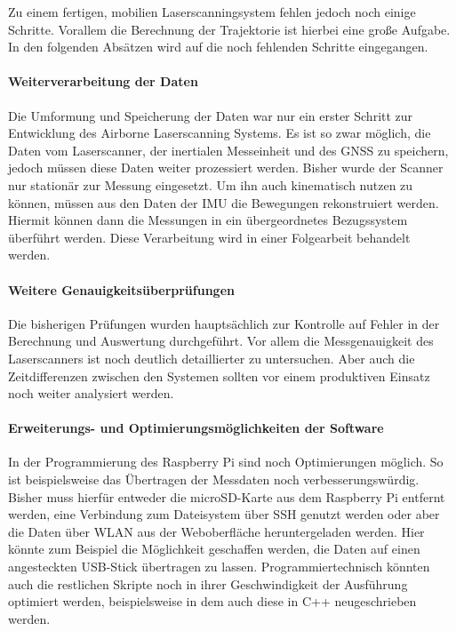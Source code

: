 \documentclass[a4paper,12pt,bibliography=totoc, listof=totoc,titlepage,pointlessnumbers]{scrreprt}
\begin{document}
Zu einem fertigen, mobilien Laserscanningsystem fehlen jedoch noch einige Schritte. Vorallem die Berechnung der Trajektorie ist hierbei eine große Aufgabe. In den folgenden Absätzen wird auf die noch fehlenden Schritte eingegangen.

\paragraph{Weiterverarbeitung der Daten}
Die Umformung und Speicherung der Daten war nur ein erster Schritt zur Entwicklung des Air\-borne Laser\-scan\-ning Systems. Es ist so zwar möglich, die Daten vom Laser\-scan\-ner, der inertialen Messeinheit und des GNSS zu speichern, jedoch müssen diese Daten weiter prozessiert werden. Bisher wurde der Scanner nur stationär zur Messung eingesetzt. Um  ihn auch kinematisch nutzen zu können, müssen aus den Daten der IMU die Bewegungen rekonstruiert werden. Hiermit können dann die Messungen in ein übergeordnetes Bezugssystem überführt werden. Diese Verarbeitung wird in einer Folgearbeit behandelt werden.

\paragraph{Weitere Ge\-nau\-ig\-keits\-über\-prü\-fungen}
Die bisherigen Prü\-fungen wurden haupt\-säch\-lich zur Kontrolle auf Fehler in der Berechnung und Auswertung durchgeführt. Vor allem die Messgenauigkeit des Laserscanners ist noch deutlich detaillierter zu untersuchen. Aber auch die Zeitdifferenzen zwischen den Systemen sollten vor einem produktiven Einsatz noch weiter analysiert werden.

\paragraph{Erweiterungs- und Optimierungsmöglichkeiten der Software}
In der Programmierung des Rasp\-berry Pi sind noch Optimierungen möglich. So ist beispielsweise das Übertragen der Messdaten noch verbesserungswürdig. Bisher muss hierfür entweder die microSD-Karte aus dem Rasp\-berry Pi entfernt werden, eine Verbindung zum Dateisystem über SSH genutzt werden oder aber die Daten über WLAN aus der Weboberfläche heruntergeladen werden. Hier könnte zum Beispiel die Mög\-lich\-keit geschaffen werden, die Daten auf einen angesteckten USB-Stick übertragen zu lassen. Programmiertechnisch könnten auch die restlichen Skripte noch in ihrer Geschwindigkeit der Ausführung optimiert werden, beispielsweise in dem auch diese in C++ neugeschrieben werden.
\end{document}
